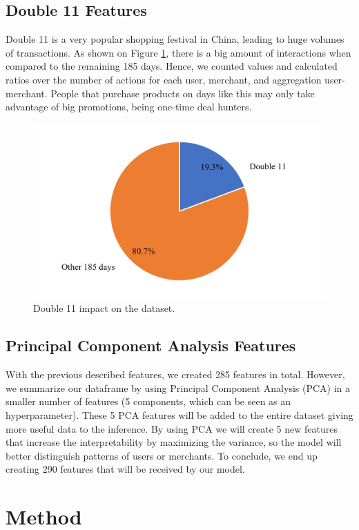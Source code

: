 \documentclass{article}
\begin{document}
\subsection{Double 11 Features}

Double 11 is a very popular shopping festival in China, leading to huge volumes of transactions. As shown on Figure \ref{fig:double11}, there is a big amount of interactions when compared to the remaining 185 days. Hence, we counted values and calculated ratios over the number of actions for each user, merchant, and aggregation user-merchant. People that purchase products on days like this may only take advantage of big promotions, being one-time deal hunters.
\vspace{-0.3cm}
\begin{figure}[h!]
    \centering
    \includegraphics[width=0.65\linewidth]{figs/double11.png}
    \caption{Double 11 impact on the dataset.}
    \label{fig:double11}
\end{figure}

\vspace{4cm}

\subsection{Principal Component Analysis Features}

With the previous described features, we created 285 features in total. However, we summarize our dataframe by using Principal Component Analysis (PCA) in a smaller number of features (5 components, which can be seen as an hyperparameter). These 5 PCA features will be added to the entire dataset giving more useful data to the inference. By using PCA we will create 5 new features that increase the interpretability by maximizing the variance, so the model will better distinguish patterns of users or merchants. To conclude, we end up creating 290 features that will be received by our model.

\section{Method}\label{method_section}
\end{document}
